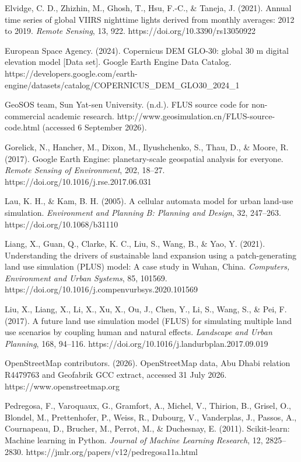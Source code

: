 \documentclass[
]{article}
\begin{document}
Elvidge, C. D., Zhizhin, M., Ghosh, T., Hsu, F.-C., \& Taneja, J.
(2021). Annual time series of global VIIRS nighttime lights derived from
monthly averages: 2012 to 2019. \emph{Remote Sensing}, 13, 922.
https://doi.org/10.3390/rs13050922

European Space Agency. (2024). Copernicus DEM GLO-30: global 30 m
digital elevation model {[}Data set{]}. Google Earth Engine Data
Catalog.
https://developers.google.com/earth-engine/datasets/catalog/COPERNICUS\_DEM\_GLO30\_2024\_1

GeoSOS team, Sun Yat-sen University. (n.d.). FLUS source code for
non-commercial academic research.
http://www.geosimulation.cn/FLUS-source-code.html (accessed 6 September
2026).

Gorelick, N., Hancher, M., Dixon, M., Ilyushchenko, S., Thau, D., \&
Moore, R. (2017). Google Earth Engine: planetary-scale geospatial
analysis for everyone. \emph{Remote Sensing of Environment}, 202,
18--27. https://doi.org/10.1016/j.rse.2017.06.031

Lau, K. H., \& Kam, B. H. (2005). A cellular automata model for urban
land-use simulation. \emph{Environment and Planning B: Planning and
Design}, 32, 247--263. https://doi.org/10.1068/b31110

Liang, X., Guan, Q., Clarke, K. C., Liu, S., Wang, B., \& Yao, Y.
(2021). Understanding the drivers of sustainable land expansion using a
patch-generating land use simulation (PLUS) model: A case study in
Wuhan, China. \emph{Computers, Environment and Urban Systems}, 85,
101569. https://doi.org/10.1016/j.compenvurbsys.2020.101569

Liu, X., Liang, X., Li, X., Xu, X., Ou, J., Chen, Y., Li, S., Wang, S.,
\& Pei, F. (2017). A future land use simulation model (FLUS) for
simulating multiple land use scenarios by coupling human and natural
effects. \emph{Landscape and Urban Planning}, 168, 94--116.
https://doi.org/10.1016/j.landurbplan.2017.09.019

OpenStreetMap contributors. (2026). OpenStreetMap data, Abu Dhabi
relation R4479763 and Geofabrik GCC extract, accessed 31 July 2026.
https://www.openstreetmap.org

Pedregosa, F., Varoquaux, G., Gramfort, A., Michel, V., Thirion, B.,
Grisel, O., Blondel, M., Prettenhofer, P., Weiss, R., Dubourg, V.,
Vanderplas, J., Passos, A., Cournapeau, D., Brucher, M., Perrot, M., \&
Duchesnay, E. (2011). Scikit-learn: Machine learning in Python.
\emph{Journal of Machine Learning Research}, 12, 2825--2830.
https://jmlr.org/papers/v12/pedregosa11a.html
\end{document}
